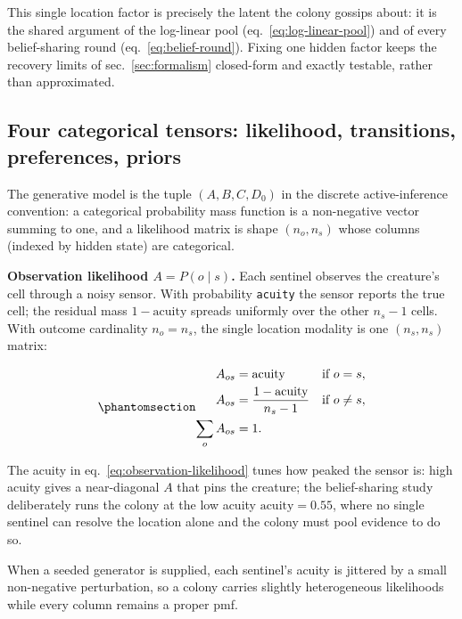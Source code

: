 \documentclass[
  english,
]{article}
\theoremstyle{plain}
\theoremstyle{definition}
\theoremstyle{remark}
\theoremstyle{definition}
\begin{document}
This single location factor is precisely the latent the colony gossips
about: it is the shared argument of the log-linear pool
(eq.~\ref{eq:log-linear-pool}) and of every belief-sharing round
(eq.~\ref{eq:belief-round}). Fixing one hidden factor keeps the recovery
limits of sec.~\ref{sec:formalism} closed-form and exactly testable,
rather than approximated.

\subsection{Four categorical tensors: likelihood, transitions,
preferences, priors}\label{sec:methods-abcd}

The generative model is the tuple \((A, B, C, D_0)\) in the discrete
active-inference convention: a categorical probability mass function is
a non-negative vector summing to one, and a likelihood matrix is shape
\((n_o, n_s)\) whose columns (indexed by hidden state) are categorical.

\textbf{Observation likelihood \(A = P(o\mid s)\).} Each sentinel
observes the creature's cell through a noisy sensor. With probability
\texttt{acuity} the sensor reports the true cell; the residual mass
\(1-\text{acuity}\) spreads uniformly over the other \(n_s-1\) cells.
With outcome cardinality \(n_o = n_s\), the single location modality is
one \((n_s, n_s)\) matrix:

\begin{equation}\protect\phantomsection\label{eq:observation-likelihood}{\begin{aligned}
A_{o s} &= \text{acuity}
&& \text{if }o=s,\\
A_{o s} &= \frac{1-\text{acuity}}{n_s-1}
&& \text{if }o\neq s,\\
\sum_o A_{o s} &= 1.
\end{aligned}}\end{equation}

The acuity in eq.~\ref{eq:observation-likelihood} tunes how peaked the
sensor is: high acuity gives a near-diagonal \(A\) that pins the
creature; the belief-sharing study deliberately runs the colony at the
low acuity \(\text{acuity} = 0.55\), where no single sentinel can
resolve the location alone and the colony must pool evidence to do so.

When a seeded generator is supplied, each sentinel's acuity is jittered
by a small non-negative perturbation, so a colony carries slightly
heterogeneous likelihoods while every column remains a proper pmf.
\end{document}
